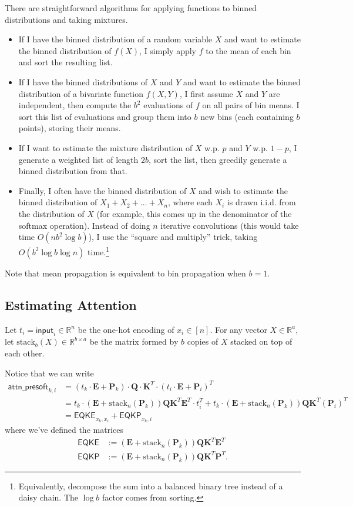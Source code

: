 \documentclass[12pt]{article}
\newcommand{\bP}{\mathbf{P}}
\newcommand{\bE}{\mathbf{E}}
\newcommand{\bQ}{\mathbf{Q}}
\newcommand{\bK}{\mathbf{K}}
\newcommand{\R}{\mathbb{R}}
\newcommand{\aps}{\mathsf{attn\_presoft}}
\begin{document}
There are straightforward algorithms for applying functions to binned distributions and taking mixtures.
\begin{itemize}
    \item If I have the binned distribution of a random variable $X$ and want to estimate the binned distribution of $f(X)$, I simply apply $f$ to the mean of each bin and sort the resulting list.
    \item If I have the binned distributions of $X$ and $Y$ and want to estimate the binned distribution of a bivariate function $f(X, Y)$, I first assume $X$ and $Y$ are independent, then compute the $b^2$ evaluations of $f$ on all pairs of bin means. I sort this list of evaluations and group them into $b$ new bins (each containing $b$ points), storing their means.
    \item If I want to estimate the mixture distribution of $X$ w.p. $p$ and $Y$ w.p. $1-p$, I generate a weighted list of length $2b$, sort the list, then greedily generate a binned distribution from that.
    \item Finally, I often have the binned distribution of $X$ and wish to estimate the binned distribution of $X_1 + X_2 + \dots + X_n$, where each $X_i$ is drawn i.i.d. from the distribution of $X$ (for example, this comes up in the denominator of the softmax operation). Instead of doing $n$ iterative convolutions (this would take time $O(n b^2 \log b)$), I use the ``square and multiply'' trick, taking $O(b^2 \log b \log n)$ time.\footnote{Equivalently, decompose the sum into a balanced binary tree instead of a daisy chain. The $\log b$ factor comes from sorting.}
\end{itemize}

Note that mean propagation is equivalent to bin propagation when $b = 1$.

\subsection{Estimating Attention} \label{sec:estattn}

Let $t_i = \mathsf{input}_i \in \R^n$ be the one-hot encoding of $x_i \in [n]$. For any vector $X \in \R^a$, let $\mathrm{stack}_b(X) \in \R^{b \times a}$ be the matrix formed by $b$ copies of $X$ stacked on top of each other.

Notice that we can write
\begin{align*}
\aps_{k, i} &= (t_k \cdot \bE + \bP_k) \cdot \bQ \cdot \bK^T \cdot (t_i \cdot \bE + \bP_i)^T \\
&= t_k \cdot (\bE + \mathrm{stack}_n(\bP_k)) \bQ \bK^T \bE^T \cdot t_i^T + t_k \cdot (\bE + \mathrm{stack}_n(\bP_k)) \bQ \bK^T (\bP_i)^T \\
&= \mathsf{EQKE}_{x_k, x_i} + \mathsf{EQKP}_{x_k, i}
\end{align*}
where we've defined the matrices
\begin{align*}
\mathsf{EQKE} &:= (\bE + \mathrm{stack}_n(\bP_k)) \bQ \bK^T \bE^T \\
\mathsf{EQKP} &:= (\bE + \mathrm{stack}_n(\bP_k)) \bQ \bK^T \bP^T.
\end{align*}
\end{document}
